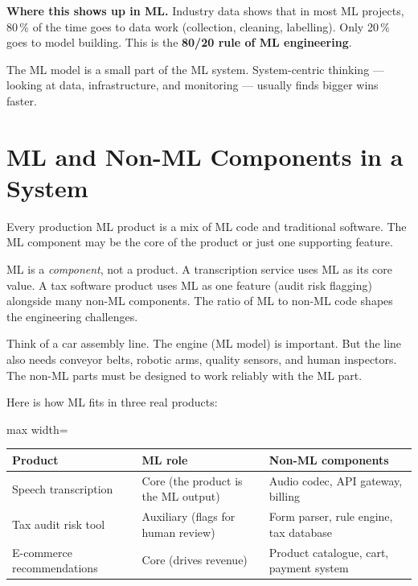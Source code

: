 \documentclass[a4paper,11pt]{article}
\newcommand{\vocab}[1]{\textbf{\color{navy}#1}}
\begin{document}
\noindent\textbf{Where this shows up in ML.}
Industry data shows that in most ML projects, 80\,\% of the time goes to data work (collection, cleaning, labelling).
Only 20\,\% goes to model building.
This is the \vocab{80/20 rule of ML engineering}.

\begin{keytake}
The ML model is a small part of the ML system.
System-centric thinking --- looking at data, infrastructure, and monitoring --- usually finds bigger wins faster.
\end{keytake}

\section{ML and Non-ML Components in a System}

Every production ML product is a mix of ML code and traditional software.
The ML component may be the core of the product or just one supporting feature.

\begin{intuition}
ML is a \emph{component}, not a product.
A transcription service uses ML as its core value.
A tax software product uses ML as one feature (audit risk flagging) alongside many non-ML components.
The ratio of ML to non-ML code shapes the engineering challenges.
\end{intuition}

\begin{everyday}
Think of a car assembly line.
The engine (ML model) is important.
But the line also needs conveyor belts, robotic arms, quality sensors, and human inspectors.
The non-ML parts must be designed to work reliably with the ML part.
\end{everyday}

\noindent Here is how ML fits in three real products:

\begin{center}
\begin{adjustbox}{max width=\linewidth}
\begin{tabular}{lll}
\toprule
\textbf{Product} & \textbf{ML role} & \textbf{Non-ML components} \\
\midrule
Speech transcription & Core (the product is the ML output) & Audio codec, API gateway, billing \\
Tax audit risk tool & Auxiliary (flags for human review) & Form parser, rule engine, tax database \\
E-commerce recommendations & Core (drives revenue) & Product catalogue, cart, payment system \\
\bottomrule
\end{tabular}
\end{adjustbox}
\end{center}
\end{document}
